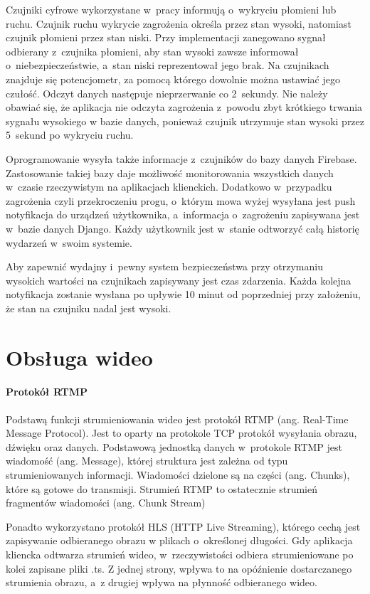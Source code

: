 Czujniki cyfrowe wykorzystane w~pracy informują o~wykryciu płomieni lub ruchu. Czujnik ruchu wykrycie zagrożenia określa przez stan wysoki, natomiast czujnik płomieni przez stan niski. Przy implementacji zanegowano sygnał odbierany z~czujnika płomieni, aby stan wysoki zawsze informował o~niebezpieczeństwie, a~stan niski reprezentował jego brak. Na czujnikach znajduje się potencjometr, za pomocą którego dowolnie można ustawiać jego czułość. Odczyt danych następuje nieprzerwanie co 2~sekundy. Nie należy obawiać się, że aplikacja nie odczyta zagrożenia z~powodu zbyt krótkiego trwania sygnału wysokiego w bazie danych, ponieważ czujnik utrzymuje stan wysoki przez 5~sekund po wykryciu ruchu. 

Oprogramowanie wysyła także informacje z~czujników do bazy danych Firebase. Zastosowanie takiej bazy daje możliwość monitorowania wszystkich danych w~czasie rzeczywistym na aplikacjach klienckich. Dodatkowo w~przypadku zagrożenia czyli przekroczeniu progu, o~którym mowa wyżej wysyłana jest push notyfikacja do urządzeń użytkownika, a~informacja o~zagrożeniu zapisywana jest w~bazie danych Django. Każdy użytkownik jest w~stanie odtworzyć całą historię wydarzeń w~swoim systemie.

Aby zapewnić wydajny i~pewny system bezpieczeństwa przy otrzymaniu wysokich wartości na czujnikach zapisywany jest czas zdarzenia. Każda kolejna notyfikacja zostanie wysłana po upływie 10 minut od poprzedniej przy założeniu, że stan na czujniku nadal jest wysoki. 

\section{Obsługa wideo}

\paragraph{Protokół RTMP}
Podstawą funkcji strumieniowania wideo jest protokół RTMP (ang. Real-Time Message Protocol). Jest to oparty na protokole TCP protokół wysyłania obrazu, dźwięku oraz danych. \cite{MOBILERTMP}
Podstawową jednostką danych w~protokole RTMP jest wiadomość (ang. Message), której struktura jest zależna od typu strumieniowanych informacji. 
Wiadomości dzielone są na części (ang. Chunks), które są gotowe do transmisji. Strumień RTMP to ostatecznie strumień fragmentów wiadomości (ang. Chunk Stream) \cite{STREAMRTMP}

Ponadto wykorzystano protokół HLS (HTTP Live Streaming), którego cechą jest zapisywanie odbieranego obrazu w plikach o~określonej długości. Gdy aplikacja kliencka odtwarza strumień wideo, w~rzeczywistości odbiera strumieniowane po kolei zapisane pliki .ts. Z jednej strony, wpływa to na opóźnienie dostarczanego strumienia obrazu, a~z drugiej wpływa na płynność odbieranego wideo.

